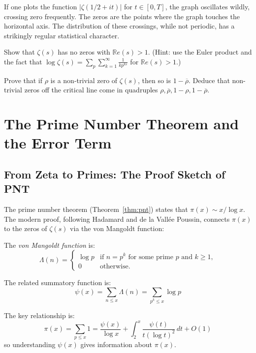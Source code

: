 If one plots the function $|\zeta(1/2 + it)|$ for $t \in [0, T]$, the graph oscillates wildly, crossing zero frequently. The zeros are the points where the graph touches the horizontal axis. The distribution of these crossings, while not periodic, has a strikingly regular statistical character.

\begin{exercise}
\label{ex:nontropos}
Show that $\zeta(s)$ has no zeros with $\mathbb{R}e(s) > 1$. (Hint: use the Euler product and the fact that $\log \zeta(s) = \sum_p \sum_{k=1}^{\infty} \frac{1}{k p^{ks}}$ for $\mathbb{R}e(s) > 1$.)
\end{exercise}

\begin{exercise}
\label{ex:symmetry}
Prove that if $\rho$ is a non-trivial zero of $\zeta(s)$, then so is $1 - \overline{\rho}$. Deduce that non-trivial zeros off the critical line come in quadruples $\rho, \overline{\rho}, 1-\rho, 1-\overline{\rho}$.
\end{exercise}

\section{The Prime Number Theorem and the Error Term}
\label{sec:pnt_error}

\subsection{From Zeta to Primes: The Proof Sketch of PNT}

The prime number theorem (Theorem~\ref{thm:pnt}) states that $\pi(x) \sim x / \log x$. The modern proof, following Hadamard and de la Vall\'{e}e Poussin, connects $\pi(x)$ to the zeros of $\zeta(s)$ via the von Mangoldt function:

\begin{definition}
The \textit{von Mangoldt function} is:
\[
\Lambda(n) = \begin{cases} \log p & \text{if } n = p^k \text{ for some prime } p \text{ and } k \ge 1, \\ 0 & \text{otherwise.} \end{cases}
\]
\end{definition}

The related summatory function is:
\[
\psi(x) = \sum_{n \le x} \Lambda(n) = \sum_{p^k \le x} \log p
\]

The key relationship is:
\[
\pi(x) = \sum_{p \le x} 1 = \frac{\psi(x)}{\log x} + \int_2^x \frac{\psi(t)}{t(\log t)^2} \, dt + O(1)
\]
so understanding $\psi(x)$ gives information about $\pi(x)$.

